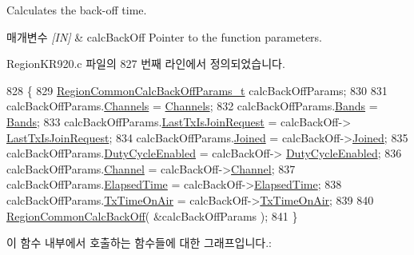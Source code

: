 Calculates the back-\/off time. 


\begin{DoxyParams}{매개변수}
{\em \mbox{[}\+I\+N\mbox{]}} & calc\+Back\+Off Pointer to the function parameters. \\
\hline
\end{DoxyParams}


Region\+K\+R920.\+c 파일의 827 번째 라인에서 정의되었습니다.


\begin{DoxyCode}
828 \{
829     \mbox{\hyperlink{structs_region_common_calc_back_off_params}{RegionCommonCalcBackOffParams\_t}} calcBackOffParams;
830 
831     calcBackOffParams.\mbox{\hyperlink{structs_region_common_calc_back_off_params_afecbd1e457cbd79eb7072bd140ff33d4}{Channels}} = \mbox{\hyperlink{_region_k_r920_8c_aa22cc2ed5f1e155ccf4f0c0388da513e}{Channels}};
832     calcBackOffParams.\mbox{\hyperlink{structs_region_common_calc_back_off_params_a18afce97f43b46e9d294e5babbb15f15}{Bands}} = \mbox{\hyperlink{_region_k_r920_8c_a12f2ea1fb6e7f8812338a8192ce15797}{Bands}};
833     calcBackOffParams.\mbox{\hyperlink{structs_region_common_calc_back_off_params_a4088d0ca2ff21fd5cdc110e14816dd53}{LastTxIsJoinRequest}} = calcBackOff->
      \mbox{\hyperlink{structs_calc_back_off_params_a4088d0ca2ff21fd5cdc110e14816dd53}{LastTxIsJoinRequest}};
834     calcBackOffParams.\mbox{\hyperlink{structs_region_common_calc_back_off_params_ac2f6caa0f3b02d2ac5056c3ee7c22652}{Joined}} = calcBackOff->\mbox{\hyperlink{structs_calc_back_off_params_ac2f6caa0f3b02d2ac5056c3ee7c22652}{Joined}};
835     calcBackOffParams.\mbox{\hyperlink{structs_region_common_calc_back_off_params_a4d755868e0e80089462286c3ba6a6f18}{DutyCycleEnabled}} = calcBackOff->
      \mbox{\hyperlink{structs_calc_back_off_params_a4d755868e0e80089462286c3ba6a6f18}{DutyCycleEnabled}};
836     calcBackOffParams.\mbox{\hyperlink{structs_region_common_calc_back_off_params_a1ca6f01ca18afe402de51babe8c95f5e}{Channel}} = calcBackOff->\mbox{\hyperlink{structs_calc_back_off_params_a1ca6f01ca18afe402de51babe8c95f5e}{Channel}};
837     calcBackOffParams.\mbox{\hyperlink{structs_region_common_calc_back_off_params_a2ece30988e7a5bac284623173173c71a}{ElapsedTime}} = calcBackOff->\mbox{\hyperlink{structs_calc_back_off_params_a2ece30988e7a5bac284623173173c71a}{ElapsedTime}};
838     calcBackOffParams.\mbox{\hyperlink{structs_region_common_calc_back_off_params_aa17a8607485db100d315e74853dd217e}{TxTimeOnAir}} = calcBackOff->\mbox{\hyperlink{structs_calc_back_off_params_aa17a8607485db100d315e74853dd217e}{TxTimeOnAir}};
839 
840     \mbox{\hyperlink{group___r_e_g_i_o_n_c_o_m_m_o_n_gae2b1dfba27c79f605048f2d9869dc57d}{RegionCommonCalcBackOff}}( &calcBackOffParams );
841 \}
\end{DoxyCode}
이 함수 내부에서 호출하는 함수들에 대한 그래프입니다.\+:
\mbox{\label{group___r_e_g_i_o_n_k_r920_gaf936d129f52abf7d56602258dece3f9f}} 
